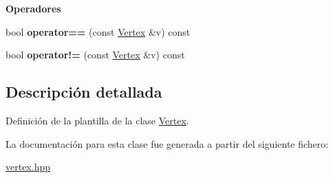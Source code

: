 \begin{Indent}{\bf Operadores}\par
\begin{DoxyCompactItemize}
\item 
\hypertarget{classedi_1_1Vertex_ac525ae81d5200adcd873ce17c971e6e2}{}bool {\bfseries operator==} (const \hyperlink{classedi_1_1Vertex}{Vertex} \&v) const \label{classedi_1_1Vertex_ac525ae81d5200adcd873ce17c971e6e2}

\item 
\hypertarget{classedi_1_1Vertex_ac795e928ab825f5c36b36b9d5146d724}{}bool {\bfseries operator!=} (const \hyperlink{classedi_1_1Vertex}{Vertex} \&v) const \label{classedi_1_1Vertex_ac795e928ab825f5c36b36b9d5146d724}

\end{DoxyCompactItemize}
\end{Indent}


\subsection{Descripción detallada}
Definición de la plantilla de la clase \hyperlink{classedi_1_1Vertex}{Vertex}. 

La documentación para esta clase fue generada a partir del siguiente fichero\+:\begin{DoxyCompactItemize}
\item 
\hyperlink{vertex_8hpp}{vertex.\+hpp}\end{DoxyCompactItemize}
